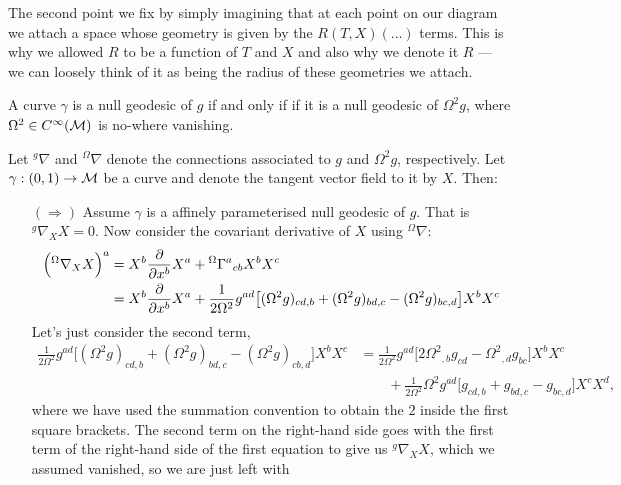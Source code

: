     The second point we fix by simply imagining that at each point on our diagram we attach a space whose geometry is given by the $R(T,X)(...)$ terms. This is why we allowed $R$ to be a function of $T$ and $X$ and also why we denote it $R$ --- we can loosely think of it as being the radius of these geometries we attach.
\er 

\bp 
    A curve $\gamma$ is a null geodesic of $g$ if and only if if it is a null geodesic of $\Omega^2g$, where $\Omega^2\in C^{\infty}(\mathcal{M})$ is no-where vanishing.
\ep 

\bq 
    Let $^g\nabla$ and $^\Omega\nabla$ denote the connections associated to $g$ and $\Omega^2g$, respectively. Let $\gamma:(0,1)\to\mathcal{M}$ be a curve and denote the tangent vector field to it by $X$. Then:
    \begin{itemize}
        \item[$(\Rightarrow)$] Assume $\gamma$ is a affinely parameterised null geodesic of $g$. That is $^g\nabla_X X = 0$. Now consider the covariant derivative of $X$ using $^\Omega\nabla$:
        \begin{equation*}
            \begin{split}
                \Big( {}^\Omega\nabla_X X\Big)^a & = X^b \frac{\partial}{\partial x^b}X^a + {}^\Omega{\Gamma^a}_{cb}X^bX^c \\
                & = X^b \frac{\partial}{\partial x^b}X^a + \frac{1}{2\Omega^2}g^{ad}\big[ (\Omega^2g)_{cd,b} + (\Omega^2g)_{bd,c} - (\Omega^2g)_{bc,d} \big]X^bX^c
            \end{split}
        \end{equation*}
        Let's just consider the second term, 
        \begin{equation*}
            \begin{split}
                \frac{1}{2\Omega^2}g^{ad}\big[(\Omega^2g)_{cd,b} + (\Omega^2g)_{bd,c} - (\Omega^2g)_{cb,d}\big]X^bX^c & = \frac{1}{2\Omega^2}g^{ad}\big[2{\Omega^2}_{,b} g_{cd} - {\Omega^2}_{,d} g_{bc}\big]X^bX^c \\
                & \qquad + \frac{1}{2\Omega^2}\Omega^2g^{ad}\big[g_{cd,b} + g_{bd,c} - g_{bc,d}\big]X^cX^d,
            \end{split}
        \end{equation*}
        where we have used the summation convention to obtain the $2$ inside the first square brackets. The second term on the right-hand side goes with the first term of the right-hand side of the first equation to give us $^g\nabla_XX$, which we assumed vanished, so we are just left with 

\end{itemize}
